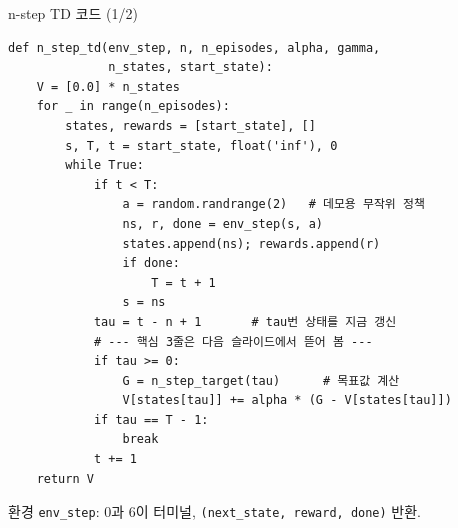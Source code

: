 \begin{frame}[fragile,shrink=27]{n-step TD 코드 (1/2)}
  \begin{lstlisting}[basicstyle=\ttfamily\footnotesize]
def n_step_td(env_step, n, n_episodes, alpha, gamma,
              n_states, start_state):
    V = [0.0] * n_states
    for _ in range(n_episodes):
        states, rewards = [start_state], []
        s, T, t = start_state, float('inf'), 0
        while True:
            if t < T:
                a = random.randrange(2)   # 데모용 무작위 정책
                ns, r, done = env_step(s, a)
                states.append(ns); rewards.append(r)
                if done:
                    T = t + 1
                s = ns
            tau = t - n + 1       # tau번 상태를 지금 갱신
            # --- 핵심 3줄은 다음 슬라이드에서 뜯어 봄 ---
            if tau >= 0:
                G = n_step_target(tau)      # 목표값 계산
                V[states[tau]] += alpha * (G - V[states[tau]])
            if tau == T - 1:
                break
            t += 1
    return V
  \end{lstlisting}
  {\footnotesize 환경 \texttt{env\_step}: 0과 6이 터미널,
  \texttt{(next\_state, reward, done)} 반환.}
\end{frame}
